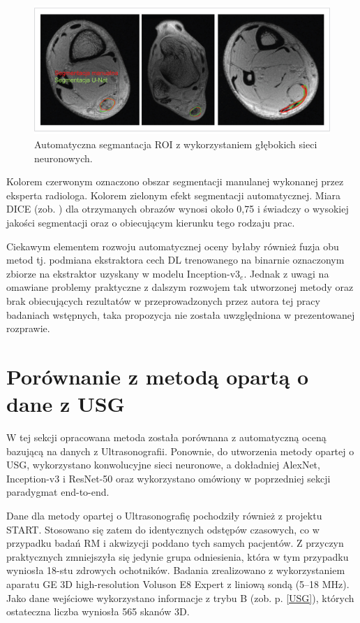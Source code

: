 \begin{figure}[h]
	\centering
	\includegraphics[width=1\textwidth]{figures/Segmentacja.jpg}
	\caption{Automatyczna segmantacja ROI z wykorzystaniem głębokich sieci neuronowych.}\label{fig:segmentacja}
\end{figure}
Kolorem czerwonym oznaczono obszar segmentacji manulanej wykonanej przez eksperta radiologa. Kolorem zielonym efekt segmentacji automatycznej. Miara DICE (zob. \cite{Zou2004}) dla otrzymanych obrazów wynosi około 0,75 i świadczy o wysokiej jakości segmentacji oraz o obiecującym kierunku tego rodzaju prac.

Ciekawym elementem rozwoju automatycznej oceny byłaby również fuzja obu metod tj. podmiana ekstraktora cech DL trenowanego na binarnie oznaczonym zbiorze na ekstraktor uzyskany w modelu Inception-v3$_e$. Jednak z uwagi na omawiane problemy praktyczne z dalszym rozwojem tak utworzonej metody oraz brak obiecujących rezultatów w przeprowadzonych przez autora tej pracy badaniach wstępnych, taka propozycja nie została uwzględniona w prezentowanej rozprawie. 

\section{Porównanie z metodą opartą o dane z USG}
\label{seq:comp-usg}
W tej sekcji opracowana metoda została porównana z automatyczną oceną bazującą na danych z Ultrasonografii. Ponownie, do utworzenia metody opartej o USG, wykorzystano konwolucyjne sieci neuronowe, a dokładniej AlexNet, Inception-v3 i ResNet-50 oraz wykorzystano omówiony w poprzedniej sekcji paradygmat end-to-end. 

Dane dla metody opartej o Ultrasonografię pochodziły również z projektu START. Stosowano się zatem do identycznych odstępów czasowych, co w przypadku badań RM i akwizycji poddano tych samych pacjentów. Z przyczyn praktycznych zmniejszyła się jedynie grupa odniesienia, która w tym przypadku wyniosła 18-stu zdrowych ochotników. Badania zrealizowano z wykorzystaniem aparatu GE 3D high-resolution Voluson E8 Expert z liniową sondą (5--18 MHz). Jako dane wejściowe wykorzystano informacje z trybu B (zob. p. \ref{USG}), których ostateczna liczba wyniosła 565 skanów 3D. 

